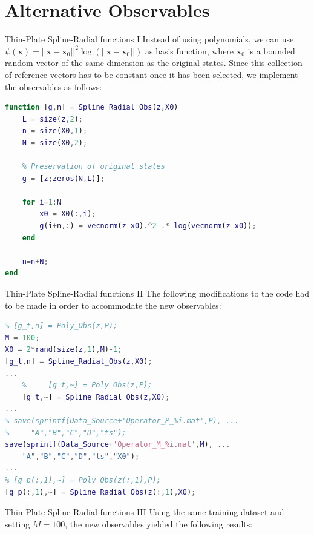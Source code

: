 \documentclass{beamer}
\begin{document}
\section{Alternative Observables}

\begin{frame}[fragile]{Thin-Plate Spline-Radial functions I}
    Instead of using polynomials, we can use $\psi\left(\mathbf{x}\right) = \left|\left|\mathbf{x}-\mathbf{x}_0\right|\right|^2 \log{\left(\left|\left|\mathbf{x}-\mathbf{x}_0\right|\right|\right)}$ as basis function, where $\mathbf{x}_0$ is a bounded random vector of the same dimension as the original states. Since this collection of reference vectors has to be constant once it has been selected, we implement the observables as follows:

    \begin{lstlisting}[language=Matlab,basicstyle=\tiny]
function [g,n] = Spline_Radial_Obs(z,X0)
    L = size(z,2);
    n = size(X0,1);
    N = size(X0,2);
    
    % Preservation of original states
    g = [z;zeros(N,L)];

    for i=1:N
        x0 = X0(:,i);
        g(i+n,:) = vecnorm(z-x0).^2 .* log(vecnorm(z-x0));
    end

    n=n+N;
end
    \end{lstlisting}
\end{frame}

\begin{frame}[fragile]{Thin-Plate Spline-Radial functions II}
    The following modifications to the code had to be made in order to accommodate the new observables:

    \begin{lstlisting}[language=Matlab,basicstyle=\tiny]
% P = 12;
% [g_t,n] = Poly_Obs(z,P);
M = 100;
X0 = 2*rand(size(z,1),M)-1;
[g_t,n] = Spline_Radial_Obs(z,X0);
...
    %     [g_t,~] = Poly_Obs(z,P);
    [g_t,~] = Spline_Radial_Obs(z,X0);
...
% save(sprintf(Data_Source+'Operator_P_%i.mat',P), ...
%     "A","B","C","D","ts");
save(sprintf(Data_Source+'Operator_M_%i.mat',M), ...
    "A","B","C","D","ts","X0");
...
% [g_p(:,1),~] = Poly_Obs(z(:,1),P);
[g_p(:,1),~] = Spline_Radial_Obs(z(:,1),X0);
    \end{lstlisting}
\end{frame}

\begin{frame}{Thin-Plate Spline-Radial functions III}
    Using the same training dataset and setting $M=100$, the new observables yielded the following results:
\end{frame}
\end{document}
